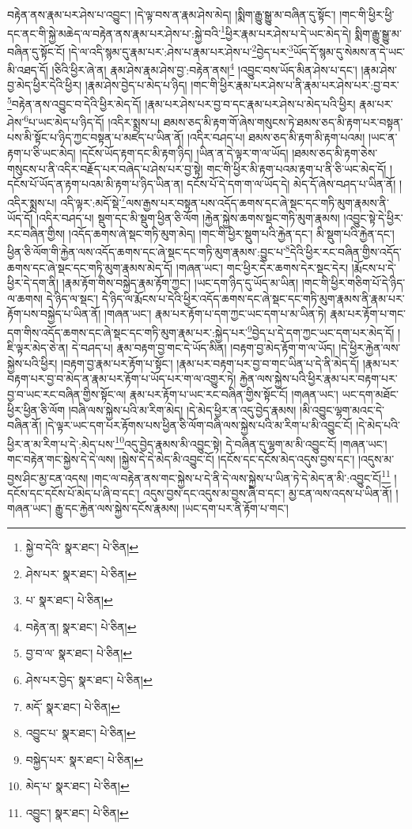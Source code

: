 བརྟེན་ནས་རྣམ་པར་ཤེས་པ་འབྱུང་། །དེ་ལྟ་བས་ན་རྣམ་ཤེས་མེད། །སྨིག་རྒྱུ་སྒྱུ་མ་བཞིན་དུ་སྟོང་། །གང་གི་ཕྱིར་ཕྱི་དང་ནང་གི་སྐྱེ་མཆེད་ལ་བརྟེན་ནས་རྣམ་པར་ཤེས་པ་:སྐྱེ་བའི་\footnote{སྐྱེ་བ་དེའི་  སྣར་ཐང་།  པེ་ཅིན། }ཕྱིར་རྣམ་པར་ཤེས་པ་དེ་ཡང་མེད་དེ། སྨིག་རྒྱུ་སྒྱུ་མ་བཞིན་དུ་སྟོང་ངོ། །དེ་ལ་འདི་སྙམ་དུ་རྣམ་པར་:ཤེས་པ་རྣམ་པར་ཤེས་པ་\footnote{ཤེས་པར་  སྣར་ཐང་།  པེ་ཅིན། }བྱེད་པར་\footnote{པ་  སྣར་ཐང་།  པེ་ཅིན། }ཡོད་དོ་སྙམ་དུ་སེམས་ན་དེ་ཡང་མི་འཐད་དོ། །ཅིའི་ཕྱིར་ཞེ་ན། རྣམ་ཤེས་རྣམ་ཤེས་བྱ་:བརྟེན་ནས།\footnote{བརྟེན་ན།  སྣར་ཐང་།  པེ་ཅིན། } །འབྱུང་བས་ཡོད་མིན་ཤེས་པ་དང་། །རྣམ་ཤེས་བྱ་མེད་ཕྱིར་དེའི་ཕྱིར། །རྣམ་ཤེས་བྱེད་པ་མེད་པ་ཉིད། །གང་གི་ཕྱིར་རྣམ་པར་ཤེས་པ་ནི་རྣམ་པར་ཤེས་པར་:བྱ་བར་\footnote{བྱ་བ་ལ་  སྣར་ཐང་།  པེ་ཅིན། }བརྟེན་ནས་འབྱུང་བ་དེའི་ཕྱིར་མེད་དོ། །རྣམ་པར་ཤེས་པར་བྱ་བ་དང་རྣམ་པར་ཤེས་པ་མེད་པའི་ཕྱིར། རྣམ་པར་ཤེས་\footnote{ཤེས་པར་བྱེད་  སྣར་ཐང་།  པེ་ཅིན། }པ་ཡང་མེད་པ་ཉིད་དོ། །འདིར་སྨྲས་པ། ཐམས་ཅད་མི་རྟག་གོ་ཞེས་གསུངས་ཏེ་ཐམས་ཅད་མི་རྟག་པར་བསྟན་པས་མི་སྟོང་པ་ཉིད་ཀྱང་བསྟན་པ་མཛད་པ་ཡིན་ནོ། །འདིར་བཤད་པ། ཐམས་ཅད་མི་རྟག་མི་རྟག་པའམ། །ཡང་ན་རྟག་པ་ཅི་ཡང་མེད། །དངོས་ཡོད་རྟག་དང་མི་རྟག་ཉིད། །ཡིན་ན་དེ་ལྟར་ག་ལ་ཡོད། །ཐམས་ཅད་མི་རྟག་ཅེས་གསུངས་པ་ནི་འདིར་བརྗོད་པར་བཞེད་པ་ཤེས་པར་བྱ་སྟེ། གང་གི་ཕྱིར་མི་རྟག་པའམ་རྟག་པ་ནི་ཅི་ཡང་མེད་དོ། །དངོས་པོ་ཡོད་ན་རྟག་པའམ་མི་རྟག་པ་ཉིད་ཡིན་ན། དངོས་པོ་དེ་དག་ག་ལ་ཡོད་དེ། མེད་དོ་ཞེས་བཤད་པ་ཡིན་ནོ། །འདིར་སྨྲས་པ། འདི་ལྟར་:མདོ་སྡེ་\footnote{མདོ་  སྣར་ཐང་།  པེ་ཅིན། }ལས་རྒྱས་པར་བསྟན་པས་འདོད་ཆགས་དང་ཞེ་སྡང་དང་གཏི་མུག་རྣམས་ནི་ཡོད་དོ། །འདིར་བཤད་པ། སྡུག་དང་མི་སྡུག་ཕྱིན་ཅི་ལོག །རྐྱེན་སྐྱེས་ཆགས་སྡང་གཏི་མུག་རྣམས། །འབྱུང་སྟེ་དེ་ཕྱིར་རང་བཞིན་གྱིས། །འདོད་ཆགས་ཞེ་སྡང་གཏི་མུག་མེད། །གང་གི་ཕྱིར་སྡུག་པའི་རྐྱེན་དང་། མི་སྡུག་པའི་རྐྱེན་དང་། ཕྱིན་ཅི་ལོག་གི་རྐྱེན་ལས་འདོད་ཆགས་དང་ཞེ་སྡང་དང་གཏི་མུག་རྣམས་:བྱུང་པ་\footnote{འབྱུང་པ་  སྣར་ཐང་།  པེ་ཅིན། }དེའི་ཕྱིར་རང་བཞིན་གྱིས་འདོད་ཆགས་དང་ཞེ་སྡང་དང་གཏི་མུག་རྣམས་མེད་དོ། །གཞན་ཡང་། གང་ཕྱིར་དེར་ཆགས་དེར་སྡང་དེར། །རྨོངས་པ་དེ་ཕྱིར་དེ་དག་ནི། །རྣམ་རྟོག་གིས་བསྐྱེད་རྣམ་རྟོག་ཀྱང་། །ཡང་དག་ཉིད་དུ་ཡོད་མ་ཡིན། །གང་གི་ཕྱིར་གཅིག་པོ་དེ་ཉིད་ལ་ཆགས། དེ་ཉིད་ལ་སྡང་། དེ་ཉིད་ལ་རྨོངས་པ་དེའི་ཕྱིར་འདོད་ཆགས་དང་ཞེ་སྡང་དང་གཏི་མུག་རྣམས་ནི་རྣམ་པར་རྟོག་པས་བསྐྱེད་པ་ཡིན་ནོ། །གཞན་ཡང་། རྣམ་པར་རྟོག་པ་དག་ཀྱང་ཡང་དག་པ་མ་ཡིན་ཏེ། རྣམ་པར་རྟོག་པ་གང་དག་གིས་འདོད་ཆགས་དང་ཞེ་སྡང་དང་གཏི་མུག་རྣམ་པར་:སྐྱེད་པར་\footnote{བསྐྱེད་པར་  སྣར་ཐང་།  པེ་ཅིན། }བྱེད་པ་དེ་དག་ཀྱང་ཡང་དག་པར་མེད་དོ། །ཇི་ལྟར་མེད་ཅེ་ན། དེ་བཤད་པ། རྣམ་བརྟག་བྱ་གང་དེ་ཡོད་མིན། །བརྟག་བྱ་མེད་རྟོག་ག་ལ་ཡོད། །དེ་ཕྱིར་རྐྱེན་ལས་སྐྱེས་པའི་ཕྱིར། །བརྟག་བྱ་རྣམ་པར་རྟོག་པ་སྟོང་། །རྣམ་པར་བརྟག་པར་བྱ་བ་གང་ཡིན་པ་དེ་ནི་མེད་དོ། །རྣམ་པར་བརྟག་པར་བྱ་བ་མེད་ན་རྣམ་པར་རྟོག་པ་ཡོད་པར་ག་ལ་འགྱུར་ཏེ། རྐྱེན་ལས་སྐྱེས་པའི་ཕྱིར་རྣམ་པར་བརྟག་པར་བྱ་བ་ཡང་རང་བཞིན་གྱིས་སྟོང་ལ། རྣམ་པར་རྟོག་པ་ཡང་རང་བཞིན་གྱིས་སྟོང་ངོ། །གཞན་ཡང་། ཡང་དག་མཐོང་ཕྱིར་ཕྱིན་ཅི་ལོག །བཞི་ལས་སྐྱེས་པའི་མ་རིག་མེད། །དེ་མེད་ཕྱིར་ན་འདུ་བྱེད་རྣམས། །མི་འབྱུང་ལྷག་མའང་དེ་བཞིན་ནོ། །དེ་ལྟར་ཡང་དག་པར་རྟོགས་པས་ཕྱིན་ཅི་ལོག་བཞི་ལས་སྐྱེས་པའི་མ་རིག་པ་མི་འབྱུང་ངོ། །དེ་མེད་པའི་ཕྱིར་ན་མ་རིག་པ་དེ་:མེད་པས་\footnote{མེད་པ་  སྣར་ཐང་།  པེ་ཅིན། }འདུ་བྱེད་རྣམས་མི་འབྱུང་སྟེ། དེ་བཞིན་དུ་ལྷག་མ་མི་འབྱུང་ངོ། །གཞན་ཡང་། གང་བརྟེན་གང་སྐྱེས་དེ་དེ་ལས། །སྐྱེས་དེ་དེ་མེད་མི་འབྱུང་ངོ། །དངོས་དང་དངོས་མེད་འདུས་བྱས་དང་། །འདུས་མ་བྱས་ཤིང་མྱ་ངན་འདས། །གང་ལ་བརྟེན་ནས་གང་སྐྱེས་པ་དེ་ནི་དེ་ལས་སྐྱེས་པ་ཡིན་ཏེ་དེ་མེད་ན་མི་:འབྱུང་ངོ།\footnote{འབྱུང་།  སྣར་ཐང་།  པེ་ཅིན། } །དངོས་དང་དངོས་པོ་མེད་པ་ཞི་བ་དང་། འདུས་བྱས་དང་འདུས་མ་བྱས་ཞི་བ་དང་། མྱ་ངན་ལས་འདས་པ་ཡིན་ནོ། །གཞན་ཡང་། རྒྱུ་དང་རྐྱེན་ལས་སྐྱེས་དངོས་རྣམས། །ཡང་དག་པར་ནི་རྟོག་པ་གང་། 
